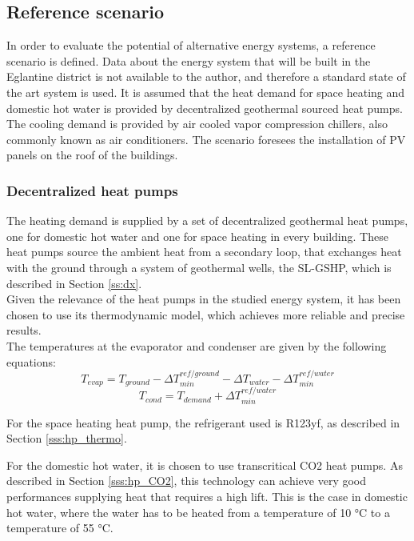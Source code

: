 \documentclass{article}
\begin{document}
\subsection{Reference scenario}
In order to evaluate the potential of alternative energy systems, a reference scenario is defined. Data about the energy system that will be built in the Eglantine district is not available to the author, and therefore a standard state of the art system is used. It is assumed that the heat demand for space heating and domestic hot water is provided by decentralized geothermal sourced heat pumps. The cooling demand is provided by air cooled vapor compression chillers, also commonly known as air conditioners. The scenario foresees the installation of PV panels on the roof of the buildings.

\subsubsection{Decentralized heat pumps}
The heating demand is supplied by a set of decentralized geothermal heat pumps, one for domestic hot water and one for space heating in every building. These heat pumps source the ambient heat from a secondary loop, that exchanges heat with the ground through a system of geothermal wells, the SL-GSHP, which is described in Section \ref{ss:dx}. \\
Given the relevance of the heat pumps in the studied energy system, it has been chosen to use its thermodynamic model, which achieves more reliable and precise results.\\
The temperatures at the evaporator and condenser are given by the following equations:
\begin{equation}
    T_{evap} = T_{ground} - \Delta T_{min}^{ref/ground} - \Delta T_{water} - \Delta T_{min}^{ref/water}
\end{equation}
\begin{equation}
    T_{cond} = T_{demand} + \Delta T_{min}^{ref/water}
\end{equation}

For the space heating heat pump, the refrigerant used is R123yf, as described in Section \ref{sss:hp_thermo}.

For the domestic hot water, it is chosen to use transcritical CO2 heat pumps. As described in Section \ref{sss:hp_CO2}, this technology can achieve very good performances supplying heat that requires a high lift. This is the case in domestic hot water, where the water has to be heated from a temperature of 10 \si{\celsius} to a temperature of 55 \si{\celsius}.
\end{document}
